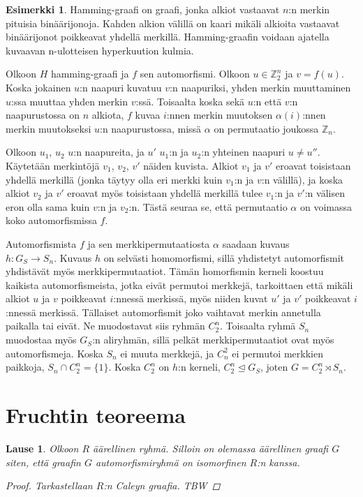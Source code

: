 \documentclass[a4paper, 12pt]{article}
\theoremstyle{definition}
\newtheorem{example}[mydef]{Esimerkki}
\theoremstyle{plain}
\newtheorem{teor}[mydef]{Lause}
\begin{document}
\begin{example}
Hamming-graafi on graafi, jonka alkiot vastaavat $n$:n merkin pituisia binäärijonoja. Kahden alkion välillä on kaari mikäli alkioita vastaavat binäärijonot poikkeavat yhdellä merkillä. Hamming-graafin voidaan ajatella kuvaavan n-ulotteisen hyperkuution kulmia.

Olkoon $H$ hamming-graafi ja $f$ sen automorfismi. Olkoon $u \in \mathbb{Z}_2^n$ ja $v = f(u)$. Koska jokainen $u$:n naapuri kuvatuu $v$:n naapuriksi, yhden merkin muuttaminen $u$:ssa muuttaa yhden merkin $v$:ssä. Toisaalta koska sekä $u$:n että $v$:n naapurustossa on $n$ alkiota, $f$ kuvaa $i$:nnen merkin muutoksen $\alpha(i)$:nnen merkin muutokseksi $u$:n naapurustossa, missä $\alpha$ on permutaatio joukossa $\mathbb{Z}_n$. 

Olkoon $u_1$, $u_2$ $u$:n naapureita, ja $u'$ $u_1$:n ja $u_2$:n yhteinen naapuri $u \neq u''$. Käytetään merkintöjä $v_1$, $v_2$, $v'$ näiden kuvista. Alkiot $v_1$ ja $v'$ eroavat toisistaan yhdellä merkillä (jonka täytyy olla eri merkki kuin $v_1$:n ja $v$:n välillä), ja koska alkiot $v_2$ ja $v'$ eroavat myös toisistaan yhdellä merkillä tulee $v_1$:n ja $v'$:n välisen eron olla sama kuin $v$:n ja $v_2$:n. Tästä seuraa se, että permutaatio $\alpha$ on voimassa koko automorfismissa $f$. 

Automorfismista $f$ ja sen merkkipermutaatiosta $\alpha$ saadaan kuvaus \\${h: G_S \rightarrow S_n}$. Kuvaus $h$ on selvästi homomorfismi, sillä yhdistetyt automorfismit yhdistävät myös merkkipermutaatiot. Tämän homorfismin kerneli koostuu kaikista automorfismeista, jotka eivät permutoi merkkejä, tarkoittaen että mikäli alkiot $u$ ja $v$ poikkeavat $i$:nnessä merkissä, myös niiden kuvat $u'$ ja $v'$ poikkeavat $i$:nnessä merkissä. Tällaiset automorfismit joko vaihtavat merkin annetulla paikalla tai eivät. Ne muodostavat siis ryhmän $C_2^n$. Toisaalta ryhmä $S_n$ muodostaa myös $G_S$:n aliryhmän, sillä pelkät merkkipermutaatiot ovat myös automorfismeja. Koska $S_n$ ei muuta merkkejä, ja $C_n^2$ ei permutoi merkkien paikkoja, $S_n \cap C_2^n = \{ 1 \}$. Koska $C_2^n$ on $h$:n kerneli, $C_2^n \trianglelefteq G_S$, joten $G = C_2^n \rtimes S_n$.

\end{example}

\newpage

\section{Fruchtin teoreema}

\begin{teor}
Olkoon $R$ äärellinen ryhmä. Silloin on olemassa äärellinen graafi $G$ siten, että graafin $G$ automorfismiryhmä on isomorfinen $R$:n kanssa.
\begin{proof}
Tarkastellaan $R$:n Caleyn graafia.
TBW
\end{proof}
\end{teor}
\end{document}
